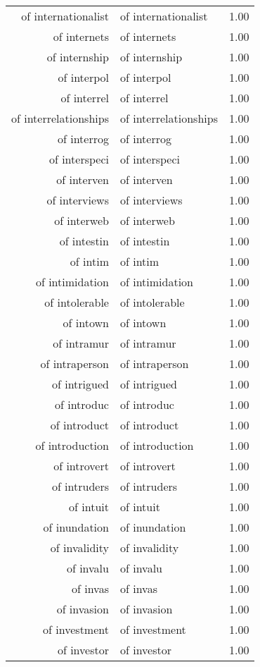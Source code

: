 \begin{table}[ht]
\begin{tabular}{rlr}
  of internationalist & of internationalist & 1.00 \\ 
  of internets & of internets & 1.00 \\ 
  of internship & of internship & 1.00 \\ 
  of interpol & of interpol & 1.00 \\ 
  of interrel & of interrel & 1.00 \\ 
  of interrelationships & of interrelationships & 1.00 \\ 
  of interrog & of interrog & 1.00 \\ 
  of interspeci & of interspeci & 1.00 \\ 
  of interven & of interven & 1.00 \\ 
  of interviews & of interviews & 1.00 \\ 
  of interweb & of interweb & 1.00 \\ 
  of intestin & of intestin & 1.00 \\ 
  of intim & of intim & 1.00 \\ 
  of intimidation & of intimidation & 1.00 \\ 
  of intolerable & of intolerable & 1.00 \\ 
  of intown & of intown & 1.00 \\ 
  of intramur & of intramur & 1.00 \\ 
  of intraperson & of intraperson & 1.00 \\ 
  of intrigued & of intrigued & 1.00 \\ 
  of introduc & of introduc & 1.00 \\ 
  of introduct & of introduct & 1.00 \\ 
  of introduction & of introduction & 1.00 \\ 
  of introvert & of introvert & 1.00 \\ 
  of intruders & of intruders & 1.00 \\ 
  of intuit & of intuit & 1.00 \\ 
  of inundation & of inundation & 1.00 \\ 
  of invalidity & of invalidity & 1.00 \\ 
  of invalu & of invalu & 1.00 \\ 
  of invas & of invas & 1.00 \\ 
  of invasion & of invasion & 1.00 \\ 
  of investment & of investment & 1.00 \\ 
  of investor & of investor & 1.00 \\ 

\end{tabular}
\end{table}
